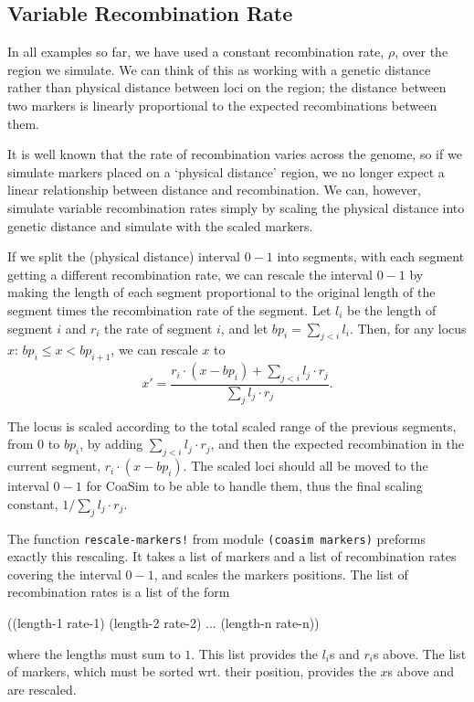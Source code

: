 \documentclass{manual}
\begin{document}
\begin{empfile}
\subsection{Variable Recombination Rate}
\label{sec:vari-recomb-rate}

In all examples so far, we have used a constant recombination rate,
$\rho$, over the region we simulate.  We can think of this as working
with a genetic distance rather than physical distance between loci on
the region; the distance between two markers is linearly proportional
to the expected recombinations between them.

It is well known that the rate of recombination varies across the
genome, so if we simulate markers placed on a `physical distance'
region, we no longer expect a linear relationship between distance and
recombination.  We can, however, simulate variable recombination rates
simply by scaling the physical distance into genetic distance and
simulate with the scaled markers.

If we split the (physical distance) interval $0-1$ into segments, with
each segment getting a different recombination rate, we can rescale
the interval $0-1$ by making the length of each segment proportional
to the original length of the segment times the recombination rate of
the segment.  Let $l_i$ be the length of segment $i$ and $r_i$ the
rate of segment $i$, and let $bp_i=\sum_{j<i}l_i$.  Then,
for any locus $x$: $bp_i \leq x < bp_{i+1}$, we can rescale $x$ to
\[x' = \frac{r_i\cdot{}(x-bp_i) + \sum_{j<i}l_j\cdot{}r_j}
            {\sum_{j}l_j\cdot{}r_j}.
\]

The locus is scaled according to the total scaled range of the
previous segments, from $0$ to $bp_i$, by adding
$\sum_{j<i}l_j\cdot{}r_j$, and then the expected recombination in the
current segment, $r_i\cdot(x-bp_i)$.  The scaled loci should all be
moved to the interval $0-1$ for CoaSim to be able to handle them, thus
the final scaling constant, $1/\sum_{j}l_j\cdot{}r_j$.


The function \texttt{rescale-markers!} from module \texttt{(coasim
  markers)} preforms exactly this rescaling.  It takes a list of
markers and a list of recombination rates covering the interval $0-1$,
and scales the markers positions.  The list of recombination rates is
a list of the form 
\begin{code}
{((length-1 rate-1) (length-2 rate-2) ... (length-n rate-n))}
\end{code}
where the lengths must sum to $1$.  This list
provides the $l_i$s and $r_i$s above.  The list of markers, which must
be sorted wrt. their position, provides the $x$s above and are
rescaled.


\end{empfile}
\end{document}
